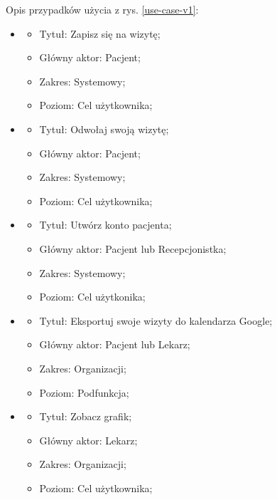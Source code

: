\documentclass[polish,12pt]{aghthesis}
\begin{document}
Opis przypadków użycia z rys. \ref{use-case-v1}:
\begin{itemize}
    \item 
        \begin{itemize}
            \item Tytuł: Zapisz się na wizytę;
            \item Główny aktor: Pacjent;
            \item Zakres: Systemowy;
            \item Poziom: Cel użytkownika;
        \end{itemize}
\item 
        \begin{itemize}
            \item Tytuł: Odwołaj swoją wizytę;
            \item Główny aktor: Pacjent;
            \item Zakres: Systemowy;
            \item Poziom: Cel użytkownika;
        \end{itemize}
\item 
        \begin{itemize}
            \item Tytuł: Utwórz konto pacjenta;
            \item Główny aktor: Pacjent lub Recepcjonistka;
            \item Zakres: Systemowy;
            \item Poziom: Cel użytkonika;
        \end{itemize}
\item 
        \begin{itemize}
            \item Tytuł: Eksportuj swoje wizyty do kalendarza Google;
            \item Główny aktor: Pacjent lub Lekarz;
            \item Zakres: Organizacji;
            \item Poziom: Podfunkcja;
        \end{itemize}
\item 
        \begin{itemize}
            \item Tytuł: Zobacz grafik;
            \item Główny aktor: Lekarz;
            \item Zakres: Organizacji;
            \item Poziom: Cel użytkownika;
        \end{itemize}

\end{itemize}
\end{document}

